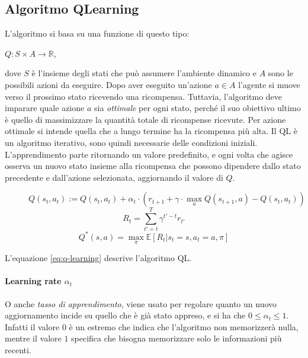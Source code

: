 \documentclass[twoside,twocolumn,10pt]{extarticle}
\theoremstyle{definition}
\begin{document}
	\subsection{Algoritmo Q\texttwelveudash Learning}
		L'algoritmo si basa su una funzione di questo tipo:
		\begin{center}
			$Q: S\times A \longrightarrow \mathbb{R}$,
		\end{center}
		dove $S$ è l'insieme degli stati che può assumere l'ambiente dinamico e $A$ sono le possibili azioni da eseguire. Dopo aver eseguito un'azione $a \in A$ l'agente si muove verso il prossimo stato ricevendo una ricompensa. Tuttavia, l'algoritmo deve imparare quale azione $a$ sia \textit{ottimale} per ogni stato, perché il suo obiettivo ultimo è quello di massimizzare la quantità totale di ricompense ricevute. Per azione ottimale si intende quella che a lungo termine ha la ricompensa più alta. Il QL è un algoritmo iterativo, sono quindi necessarie delle condizioni iniziali. L'apprendimento parte ritornando un valore predefinito, e ogni volta che agisce osserva un nuovo stato insieme alla ricompensa che possono dipendere dallo stato precedente e dall'azione selezionata, aggiornando il valore di $Q$.
		\begin{figure}[ht]
			\begin{equation}\label{eq:q-learning}
			Q(s_t, a_t) := Q(s_t, a_t) + \alpha_t \cdot (r_{t + 1} + \gamma \cdot \max_a Q(s_{t + 1}, a) - Q(s_t, a_t))
			\end{equation}
			\begin{equation}\label{eq:reward}
				R_t = \sum_{t' = t}^{T} \gamma^{t' - t} r_{t'}
			\end{equation}
			\begin{equation}\label{eq:dqn-learning}
			Q^*(s, a) = \max_\pi \mathbb{E} [R_t | s_t = s, a_t = a, \pi]
			\end{equation}
		\end{figure}
		L'equazione \ref{eq:q-learning} descrive l'algoritmo QL.
		
		\paragraph*{Learning rate $\alpha_t$}\label{par:lr} O anche \textit{tasso di apprendimento}, viene usato per regolare quanto un nuovo aggiornamento incide su quello che è già stato appreso, e si ha che $0 \leq \alpha_t \leq 1$. Infatti il valore $0$ è un estremo che indica che l'algoritmo non memorizzerà nulla, mentre il valore $1$ specifica che bisogna memorizzare solo le informazioni più recenti.
		
\end{document}
